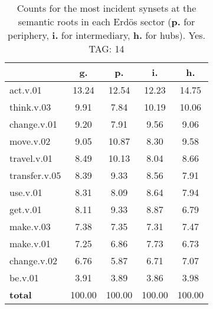 \begin{table}[h!]
\begin{center}
\begin{tabular}{| l | c | c | c | c |}\hline
 & g. & p. & i. & h. \\\hline
act.v.01 & 13.24  & 12.54  & 12.23  & 14.75 \\\hline
think.v.03 & 9.91  & 7.84  & 10.19  & 10.06 \\\hline
change.v.01 & 9.20  & 7.91  & 9.56  & 9.06 \\\hline
move.v.02 & 9.05  & 10.87  & 8.30  & 9.58 \\\hline
travel.v.01 & 8.49  & 10.13  & 8.04  & 8.66 \\\hline
transfer.v.05 & 8.39  & 9.33  & 8.56  & 7.91 \\\hline
use.v.01 & 8.31  & 8.09  & 8.64  & 7.94 \\\hline
get.v.01 & 8.11  & 9.33  & 8.87  & 6.79 \\\hline
make.v.03 & 7.38  & 7.35  & 7.31  & 7.47 \\\hline
make.v.01 & 7.25  & 6.86  & 7.73  & 6.73 \\\hline
change.v.02 & 6.76  & 5.87  & 6.71  & 7.07 \\\hline
be.v.01 & 3.91  & 3.89  & 3.86  & 3.98 \\\hline
{{\bf total}} & 100.00  & 100.00  & 100.00  & 100.00 \\\hline
\end{tabular}
\caption{Counts for the most incident synsets at the semantic roots in each Erd\"os sector ({\bf p.} for periphery, {\bf i.} for intermediary, {\bf h.} for hubs). Yes. TAG: 14}
\end{center}
\end{table}